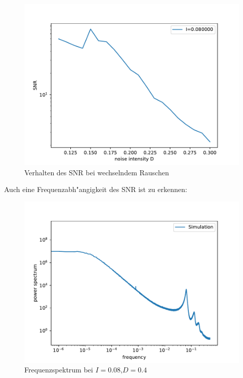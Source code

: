 \documentclass[12pt,a4paper]{article}
\begin{document}
\begin{figure}[H]
	\centering
	\includegraphics[scale=0.9]{snrdrange26.pdf}
	\caption{Verhalten des SNR bei wechselndem Rauschen}
	\label{snrf1}
\end{figure}
Auch eine Frequenzabh"angigkeit des SNR ist zu erkennen:
\begin{figure}[H]
	\centering
	\includegraphics[scale=0.9]{inapikrealfrange26jj304.pdf}
	\caption{Frequenzspektrum bei $I=0.08$,$D=0.4$}
	\label{snrf2}
\end{figure}
\end{document}
